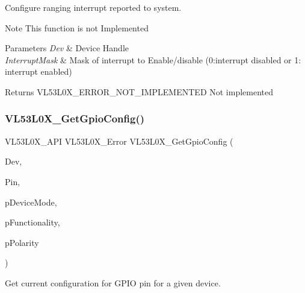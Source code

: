 Configure ranging interrupt reported to system. 

\begin{DoxyNote}{Note}
This function is not Implemented
\end{DoxyNote}

\begin{DoxyParams}{Parameters}
{\em Dev} & Device Handle \\
\hline
{\em Interrupt\+Mask} & Mask of interrupt to Enable/disable (0\+:interrupt disabled or 1\+: interrupt enabled) \\
\hline
\end{DoxyParams}
\begin{DoxyReturn}{Returns}
V\+L53\+L0\+X\+\_\+\+E\+R\+R\+O\+R\+\_\+\+N\+O\+T\+\_\+\+I\+M\+P\+L\+E\+M\+E\+N\+T\+ED Not implemented 
\end{DoxyReturn}
\mbox{\label{group__VL53L0X__interrupt__group_gadb505a2440a9e00170bca1da6ca6a50f}} 
\subsubsection{\texorpdfstring{V\+L53\+L0\+X\+\_\+\+Get\+Gpio\+Config()}{VL53L0X\_GetGpioConfig()}}
{\footnotesize\ttfamily V\+L53\+L0\+X\+\_\+\+A\+PI V\+L53\+L0\+X\+\_\+\+Error V\+L53\+L0\+X\+\_\+\+Get\+Gpio\+Config (\begin{DoxyParamCaption}\item[{\hyperlink{group__VL53L0X__platform__group_ga2d6405308b1dd524b462f1b8fb97d167}{V\+L53\+L0\+X\+\_\+\+D\+EV}}]{Dev,  }\item[{\hyperlink{vl53l0x__types_8h_aba7bc1797add20fe3efdf37ced1182c5}{uint8\+\_\+t}}]{Pin,  }\item[{V\+L53\+L0\+X\+\_\+\+Device\+Modes $\ast$}]{p\+Device\+Mode,  }\item[{V\+L53\+L0\+X\+\_\+\+Gpio\+Functionality $\ast$}]{p\+Functionality,  }\item[{V\+L53\+L0\+X\+\_\+\+Interrupt\+Polarity $\ast$}]{p\+Polarity }\end{DoxyParamCaption})}



Get current configuration for G\+P\+IO pin for a given device. 

